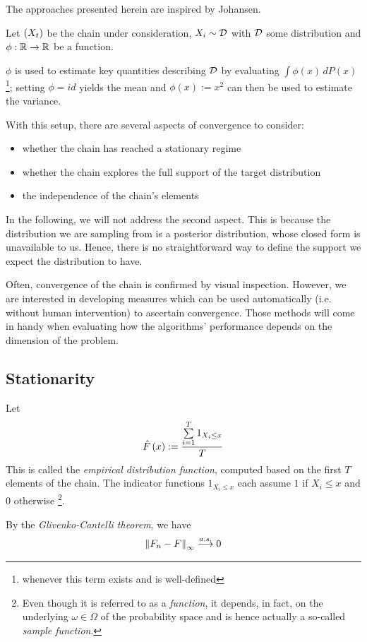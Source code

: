
The approaches presented herein are inspired by Johansen\cite{mcnotes}.



Let $\left(X_t\right)$ be the chain under consideration, $X_i \sim \mathcal{D}$ with $\mathcal{D}$ some distribution and $\phi : \mathbb{R} \rightarrow \mathbb{R}$ be a function. 

$\phi$ is used to estimate key quantities describing $\mathcal{D}$ by evaluating $\int \phi(x) \, dP(x)$\footnote{whenever this term exists and is well-defined}; setting $\phi = id$ yields the mean and $\phi(x) := x^2$ can then be used to estimate the variance. 

 
With this setup, there are several aspects of convergence to consider: 
\begin{itemize}
	\item whether the chain has reached a stationary regime
	\item whether the chain explores the full support of the target distribution 
	\item the independence of the chain's elements 
\end{itemize}

In the following, we will not address the second aspect.
This is because the distribution we are sampling from is a posterior distribution, whose closed form is unavailable to us. Hence, there is no straightforward way to define the support we expect the distribution to have.

Often, convergence of the chain is confirmed by visual inspection. However, we are interested in developing measures which can be used automatically (i.e. without human intervention) to ascertain convergence. Those methods will come in handy when evaluating how the algorithms' performance depends on the dimension of the problem.

\subsection{Stationarity}
\label{chap:stationarity}
Let 
\[
	\hat{F}\left(x\right) := \frac{\sum\limits_{i=1}^T 1_{X_i \leq x}}{T}
\]
This is called the \textit{empirical distribution function}, computed based on the first $T$ elements of the chain.
The indicator functions $1_{X_i \leq x}$ each assume $1$ if $X_i \leq x$ and $0$ otherwise \footnote{Even though it is referred to as a \textit{function}, it depends, in fact, on the underlying $\omega \in \Omega$ of the probability space and is hence actually a so-called \textit{sample function}. }. 

By the \textit{Glivenko-Cantelli theorem}, we have
\[
	\left\lVert F_n - F\right\rVert_\infty \overset{a.s.}{\longrightarrow} 0
\]

